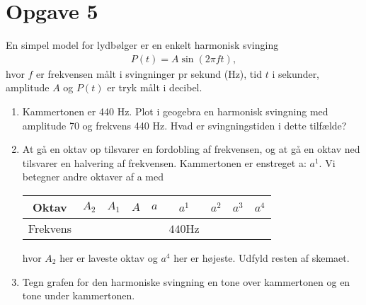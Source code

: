 \section*{Opgave 5}
En simpel model for lydbølger er en enkelt harmonisk svinging
\begin{align*}
P(t) = A\sin(2\pi f t),
\end{align*}
hvor $f$ er frekvensen målt i svingninger pr sekund (Hz), tid $t$ i sekunder, amplitude $A$ og $P(t)$ er tryk målt i decibel. 
\begin{enumerate}[label=\roman*)]
\item Kammertonen er 440 Hz. Plot i geogebra en harmonisk svingning med amplitude 70 og frekvens 440 Hz. Hvad er svingningstiden i dette tilfælde?
\item At gå en oktav op tilsvarer en fordobling af frekvensen, og at gå en oktav ned tilsvarer en halvering af frekvensen. Kammertonen er enstreget a: $a^1$. Vi betegner andre oktaver af a med
\begin{center}
\begin{tabular}{c|c|c|c|c|c|c|c|c}
Oktav & $A_2$ & $A_1$ & $A$ & $a$ & $a^1$ & $a^2$ & $a^3$ & $a^4$ \\
\hline
Frekvens&&&&&$440$Hz&&&
\end{tabular}
\end{center}
hvor $A_2$ her er laveste oktav og $a^4$ her er højeste. Udfyld resten af skemaet. 
\item Tegn grafen for den harmoniske svingning en tone over kammertonen og en tone under kammertonen. 
\end{enumerate}

